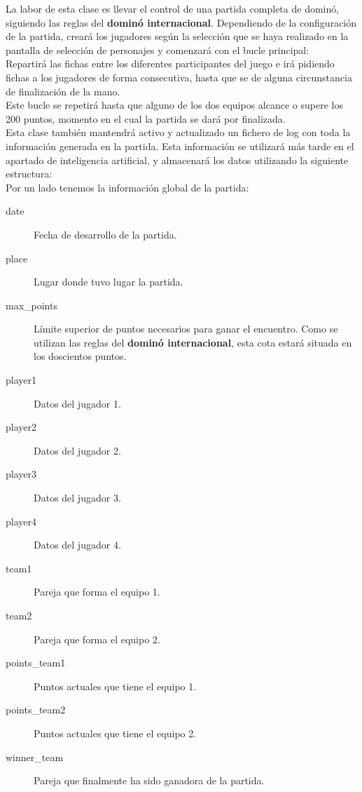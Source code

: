 La labor de esta clase es llevar el control de una partida completa de dominó, siguiendo las reglas del \textbf{dominó
internacional}. Dependiendo de la configuración de la partida, creará los jugadores según la selección que se haya
realizado en la pantalla de selección de personajes y comenzará con el bucle principal: \\

Repartirá las fichas entre los diferentes participantes del juego e irá pidiendo fichas a los jugadores de forma
consecutiva, hasta que se de alguna circunstancia de finalización de la mano. \\

Este bucle se repetirá hasta que alguno de los dos equipos alcance o supere los 200 puntos, momento en el cual la partida
se dará por finalizada. \\

Esta clase también mantendrá activo y actualizado un fichero de log con toda la información generada en la partida. Esta
información se utilizará más tarde en el apartado de inteligencia artificial, y almacenará los datos utilizando
la siguiente estructura: \\

Por un lado tenemos la información global de la partida: 

\begin{description}
    \item[date] Fecha de desarrollo de la partida.
    \item[place] Lugar donde tuvo lugar la partida.
    \item[max\_points] Límite superior de puntos necesarios para ganar el encuentro. Como se utilizan las reglas del
        \textbf{dominó internacional}, esta cota estará situada en los doscientos puntos.
    \item[player1] Datos del jugador 1.
    \item[player2] Datos del jugador 2.
    \item[player3] Datos del jugador 3.
    \item[player4] Datos del jugador 4.
    \item[team1] Pareja que forma el equipo 1.
    \item[team2] Pareja que forma el equipo 2.
    \item[points\_team1] Puntos actuales que tiene el equipo 1.
    \item[points\_team2] Puntos actuales que tiene el equipo 2.
    \item[winner\_team] Pareja que finalmente ha sido ganadora de la partida.
\end{description}


